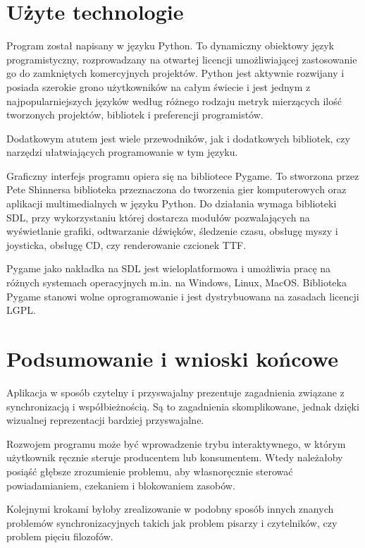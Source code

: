 \documentclass{article}
\begin{document}
\section{Użyte technologie}


\qquad Program został napisany w języku Python. To dynamiczny obiektowy język programistyczny, rozprowadzany na otwartej licencji umożliwiającej zastosowanie go do zamkniętych komercyjnych projektów. Python jest aktywnie rozwijany i posiada szerokie grono użytkowników na całym świecie i jest jednym z najpopularniejszych języków według różnego rodzaju metryk mierzących ilość tworzonych projektów, bibliotek i preferencji programistów. 

Dodatkowym atutem jest wiele przewodników, jak i dodatkowych bibliotek, czy narzędzi ułatwiających programowanie w tym języku. 

Graficzny interfejs programu opiera się na bibliotece Pygame.
To stworzona przez Pete Shinnersa biblioteka przeznaczona do tworzenia gier komputerowych oraz aplikacji multimedialnych w języku Python. Do działania wymaga biblioteki SDL, przy wykorzystaniu której dostarcza modułów pozwalających na wyświetlanie grafiki, odtwarzanie dźwięków, śledzenie czasu, obsługę myszy i joysticka, obsługę CD, czy renderowanie czcionek TTF. 

Pygame jako nakładka na SDL jest wieloplatformowa i umożliwia pracę na różnych systemach operacyjnych m.in. na Windows, Linux, MacOS. Biblioteka Pygame stanowi wolne oprogramowanie i jest dystrybuowana na zasadach licencji LGPL. 

\newpage
\section{Podsumowanie i wnioski końcowe}
\qquad Aplikacja w sposób czytelny i przyswajalny prezentuje zagadnienia związane z synchronizacją i współbieżnością. Są to zagadnienia skomplikowane, jednak dzięki wizualnej reprezentacji bardziej przyswajalne. 

Rozwojem programu może być wprowadzenie trybu interaktywnego, w którym użytkownik ręcznie steruje producentem lub konsumentem. Wtedy należałoby posiąść głębsze zrozumienie problemu, aby własnoręcznie sterować powiadamianiem, czekaniem i blokowaniem zasobów. 

Kolejnymi krokami byłoby zrealizowanie w podobny sposób innych znanych problemów synchronizacyjnych takich jak problem pisarzy i czytelników, czy problem pięciu filozofów.
\end{document}

